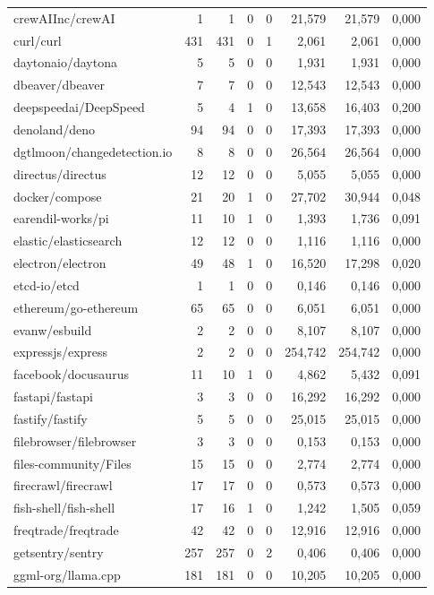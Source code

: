 \begin{tabular}{lrrrrrrr}
crewAIInc/crewAI & 1 & 1 & 0 & 0 & 21,579 & 21,579 & 0,000 \\
curl/curl & 431 & 431 & 0 & 1 & 2,061 & 2,061 & 0,000 \\
daytonaio/daytona & 5 & 5 & 0 & 0 & 1,931 & 1,931 & 0,000 \\
dbeaver/dbeaver & 7 & 7 & 0 & 0 & 12,543 & 12,543 & 0,000 \\
deepspeedai/DeepSpeed & 5 & 4 & 1 & 0 & 13,658 & 16,403 & 0,200 \\
denoland/deno & 94 & 94 & 0 & 0 & 17,393 & 17,393 & 0,000 \\
dgtlmoon/changedetection.io & 8 & 8 & 0 & 0 & 26,564 & 26,564 & 0,000 \\
directus/directus & 12 & 12 & 0 & 0 & 5,055 & 5,055 & 0,000 \\
docker/compose & 21 & 20 & 1 & 0 & 27,702 & 30,944 & 0,048 \\
earendil-works/pi & 11 & 10 & 1 & 0 & 1,393 & 1,736 & 0,091 \\
elastic/elasticsearch & 12 & 12 & 0 & 0 & 1,116 & 1,116 & 0,000 \\
electron/electron & 49 & 48 & 1 & 0 & 16,520 & 17,298 & 0,020 \\
etcd-io/etcd & 1 & 1 & 0 & 0 & 0,146 & 0,146 & 0,000 \\
ethereum/go-ethereum & 65 & 65 & 0 & 0 & 6,051 & 6,051 & 0,000 \\
evanw/esbuild & 2 & 2 & 0 & 0 & 8,107 & 8,107 & 0,000 \\
expressjs/express & 2 & 2 & 0 & 0 & 254,742 & 254,742 & 0,000 \\
facebook/docusaurus & 11 & 10 & 1 & 0 & 4,862 & 5,432 & 0,091 \\
fastapi/fastapi & 3 & 3 & 0 & 0 & 16,292 & 16,292 & 0,000 \\
fastify/fastify & 5 & 5 & 0 & 0 & 25,015 & 25,015 & 0,000 \\
filebrowser/filebrowser & 3 & 3 & 0 & 0 & 0,153 & 0,153 & 0,000 \\
files-community/Files & 15 & 15 & 0 & 0 & 2,774 & 2,774 & 0,000 \\
firecrawl/firecrawl & 17 & 17 & 0 & 0 & 0,573 & 0,573 & 0,000 \\
fish-shell/fish-shell & 17 & 16 & 1 & 0 & 1,242 & 1,505 & 0,059 \\
freqtrade/freqtrade & 42 & 42 & 0 & 0 & 12,916 & 12,916 & 0,000 \\
getsentry/sentry & 257 & 257 & 0 & 2 & 0,406 & 0,406 & 0,000 \\
ggml-org/llama.cpp & 181 & 181 & 0 & 0 & 10,205 & 10,205 & 0,000 \\

\end{tabular}
